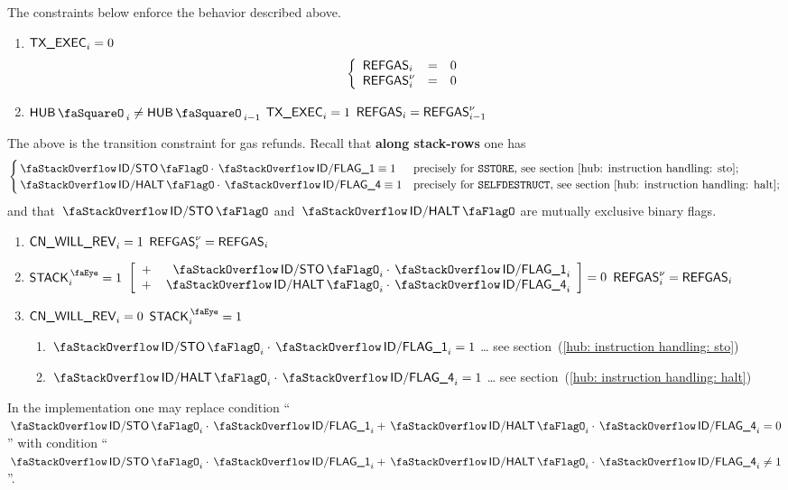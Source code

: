 
The constraints below enforce the behavior described above.
\begin{enumerate}
	\item \If $\textsf{TX}\textsf{\_EXEC}_{i}     = 0$ \Then
		\[
			\left\{ \begin{array}{lcl}
				\textsf{REFGAS}_{i}     & = & 0 \\
				\textsf{REFGAS}^{\nu}_{i} & = & 0 \\
			\end{array} \right.
		\]
	\item \If $\hubStamp_{i} \neq \hubStamp_{i - 1}$ \et $\textsf{TX}\textsf{\_EXEC}_{i} = 1$ \Then $\textsf{REFGAS}_{i} = \textsf{REFGAS}^{\nu}_{i - 1}$
\end{enumerate}
The above is the transition constraint for gas refunds.
Recall that \textbf{along stack-rows} one has
\[
	\begin{cases}
		\stackDecStoFlag \cdot \decFlag{1} \equiv 1  & \text{precisely for \inst{SSTORE},       see section~\ref{hub: instruction handling: sto};}  \\
		\stackDecHaltFlag \cdot \decFlag{4} \equiv 1 & \text{precisely for \inst{SELFDESTRUCT}, see section~\ref{hub: instruction handling: halt};} \\
	\end{cases}
\]
and that $\stackDecStoFlag$ and $\stackDecHaltFlag$ are mutually exclusive binary flags.
\begin{enumerate}[resume]
	\item \If $\textsf{CN}\textsf{\_WILL\_REV}_{i} = 1$ \Then $\textsf{REFGAS}^{\nu}_{i} = \textsf{REFGAS}_{i}$
	\item \If $\peekStack_{i} = 1$ \et $
		\left[ \begin{array}{cr}
			+ & \stackDecStoFlag  _{i} \cdot \decFlag{1}_{i} \\
			+ & \stackDecHaltFlag _{i} \cdot \decFlag{4}_{i} \\
		\end{array} \right]
		= 0$ \Then $\textsf{REFGAS}^{\nu}_{i} = \textsf{REFGAS}_{i}$
	\item \If $\textsf{CN}\textsf{\_WILL\_REV}_{i} = 0$ \et $\peekStack_{i} = 1$ \Then
		\begin{enumerate}
			\item \If $\stackDecStoFlag_{i} \cdot \decFlag{1}_{i}  = 1$ \Then \dots{} see section~(\ref{hub: instruction handling: sto})
			\item \If $\stackDecHaltFlag_{i} \cdot \decFlag{4}_{i} = 1$ \Then \dots{} see section~(\ref{hub: instruction handling: halt})
		\end{enumerate}
\end{enumerate}
\saNote{} In the implementation one may replace condition
``\If $\stackDecStoFlag_{i} \cdot \decFlag{1}_{i} + \stackDecHaltFlag_{i} \cdot \decFlag{4}_{i} = 0$'' with condition
``\If $\stackDecStoFlag_{i} \cdot \decFlag{1}_{i} + \stackDecHaltFlag_{i} \cdot \decFlag{4}_{i} \neq 1$''.
